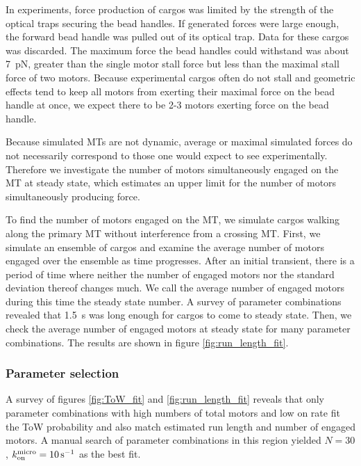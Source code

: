 In experiments, force production of cargos was limited by the strength of the optical traps securing the bead handles. If generated forces were large enough, the forward bead handle was pulled out of its optical trap. Data for these cargos was discarded. The maximum force the bead handles could withstand was about \SI{7}{\pico\newton}, greater than the single motor stall force but less than the maximal stall force of two motors\added[id=MB,remark={Should cite the supplemental figure on this}]{}. Because experimental cargos often do not stall and geometric effects tend to keep all motors from exerting their maximal force on the bead handle at once, we expect there to be 2-3 motors exerting force on the bead handle.

Because simulated MTs are not dynamic, average or maximal simulated forces do not necessarily correspond to those one would expect to see experimentally. Therefore we investigate the number of motors simultaneously engaged on the MT at steady state, which estimates an upper limit for the number of motors simultaneously producing force.

To find the number of motors engaged on the MT, we simulate cargos walking along the primary MT without interference from a crossing MT. First, we simulate an ensemble of cargos and examine the average number of motors engaged over the ensemble as time progresses. After an initial transient, there is a period of time where neither the number of engaged motors nor the standard deviation thereof changes much. We call the average number of engaged motors during this time the steady state number. A survey of parameter combinations revealed that \SI{1.5}{\second} was long enough for cargos to come to steady state. Then, we check the average number of engaged motors at steady state for many parameter combinations. The results are shown in figure \ref{fig:run_length_fit}.

\subsubsection*{Parameter selection}


A survey of figures \ref{fig:ToW_fit} and \ref{fig:run_length_fit} reveals that only parameter combinations with high numbers of total motors and low on rate fit the ToW probability and also match estimated run length and number of engaged motors. A manual search of parameter combinations in this region yielded $N=30$, $k_\text{on}^\text{micro}=\SI{10}{\per\second}$ as the best fit.

